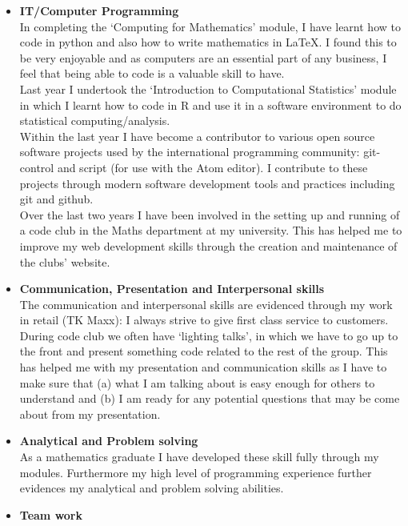 \documentclass[10pt]{res}
\begin{document}
\begin{resume}
\begin{itemize}
\item \textbf{IT/Computer Programming} \\
In completing the ‘Computing for Mathematics’ module, I have learnt how to code
in python and also how to write mathematics in \LaTeX. I found this to be very
enjoyable and as computers are an essential part of any business, I feel that
being able to code is a valuable skill to have.
\\[4pt]
Last year I undertook the ‘Introduction to Computational Statistics’ module in
which I learnt how to code in R and use it in a software environment to do
statistical computing/analysis.
\\[4pt]
Within the last year I have become a contributor to various open source software
projects used by the international programming community: git-control and script
(for use with the Atom editor). I contribute to these projects through modern
software development tools and practices including git and github.
\\[4pt]
Over the last two years I have been involved in the setting up and running of a
code club in the Maths department at my university. This has helped me to
improve my web development skills through the creation and maintenance of the
clubs' website.
\\[-10pt]
\item \textbf{Communication, Presentation and Interpersonal skills} \\
The communication and interpersonal skills are evidenced through my work in
retail (TK Maxx): I always strive to give first class service to customers.
\\[4pt]
During code club we often have `lighting talks', in which we have to go
up to the front and present something code related to the rest of the group.
This has helped me with my presentation and communication skills as I have to
make sure that (a) what I am talking about is easy enough for others to
understand and (b) I am ready for any potential questions that may be come about
from my presentation.
\\[-10pt]
\item \textbf{Analytical and Problem solving} \\
As a mathematics graduate I have developed these skill fully through my
modules. Furthermore my high level of programming experience further
evidences my analytical and problem solving abilities.
\\[-10pt]
\item \textbf{Team work} \\

\end{itemize}
\end{resume}
\end{document}
